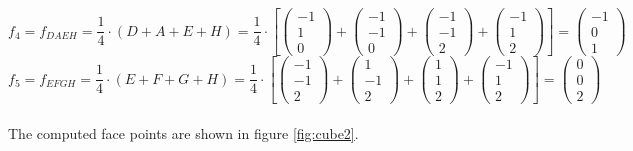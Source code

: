 \documentclass{article}
\begin{document}
\[f_4=f_{DAEH}=\frac{1}{4}\cdot(D+A+E+H)=\frac{1}{4}\cdot\left[
\left({\begin{array}{c} -1 \\  1 \\ 0 \end{array}}\right)+
\left({\begin{array}{c} -1 \\ -1 \\ 0 \end{array}}\right)+
\left({\begin{array}{c} -1 \\  -1 \\ 2 \end{array}}\right)+
\left({\begin{array}{c} -1 \\  1 \\ 2 \end{array}}\right)\right]=
\left({\begin{array}{c} -1 \\ 0 \\ 1 \end{array}}\right)
\]
\[f_5=f_{EFGH}=\frac{1}{4}\cdot(E+F+G+H)=\frac{1}{4}\cdot\left[
\left({\begin{array}{c} -1 \\  -1 \\ 2 \end{array}}\right)+
\left({\begin{array}{c} 1 \\ -1 \\ 2 \end{array}}\right)+
\left({\begin{array}{c} 1 \\  1 \\ 2 \end{array}}\right)+
\left({\begin{array}{c} -1 \\  1 \\ 2 \end{array}}\right)\right]=
\left({\begin{array}{c} 0 \\ 0 \\ 2 \end{array}}\right)
\]
\\
The computed face points are shown in figure \ref{fig:cube2}.
\end{document}
